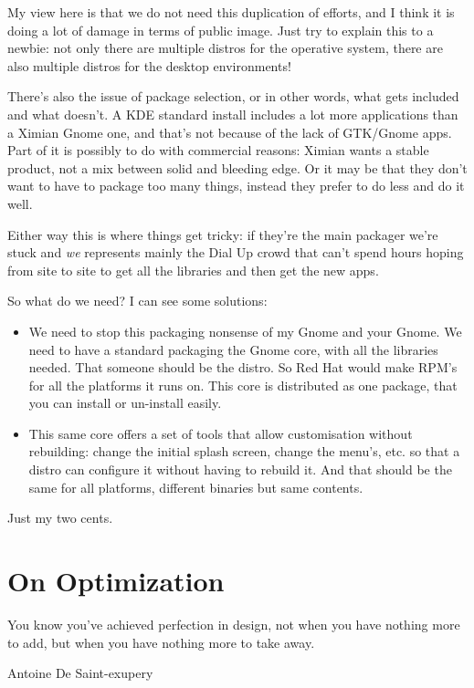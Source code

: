 \documentclass{book}
\begin{document}
My view here is that we do not need this duplication of efforts, and I
think it is doing a lot of damage in terms of public image. Just try
to explain this to a newbie: not only there are multiple distros for
the operative system, there are also multiple distros for the desktop
environments!

There's also the issue of package selection, or in other words, what
gets included and what doesn't. A KDE standard install includes a lot
more applications than a Ximian Gnome one, and that's not because of
the lack of GTK/Gnome apps. Part of it is possibly to do with
commercial reasons: Ximian wants a stable product, not a mix between
solid and bleeding edge. Or it may be that they don't want to have to
package too many things, instead they prefer to do less and do it
well.

Either way this is where things get tricky: if they're the main
packager we're stuck and \emph{we} represents mainly the Dial Up crowd
that can't spend hours hoping from site to site to get all the
libraries and then get the new apps.

So what do we need? I can see some solutions:

\begin{itemize}
\item We need to stop this packaging nonsense of my Gnome and your
  Gnome. We need to have a standard packaging the Gnome core, with all
  the libraries needed. That someone should be the distro. So Red Hat
  would make RPM's for all the platforms it runs on. This core is
  distributed as one package, that you can install or un-install
  easily.
\item This same core offers a set of tools that allow customisation
  without rebuilding: change the initial splash screen, change the
  menu's, etc. so that a distro can configure it without having to
  rebuild it. And that should be the same for all platforms, different
  binaries but same contents.
\end{itemize}

Just my two cents.

\chapter{On Optimization}

\epigraph{You know you've achieved perfection in design, not when you
  have nothing more to add, but when you have nothing more to take
  away.}{Antoine De Saint-exupery}
\end{document}
